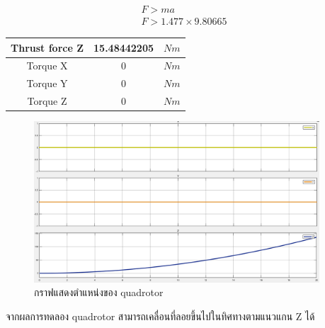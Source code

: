 \begin{equation}
    \begin{array}{c}
    {F > ma}\\
    {F > 1.477 \times 9.80665}
    \label{equ:newton_law}
    \end{array}
\end{equation}
\begin{center}
    \begin{tabular}{ | c | c | c | } 
    \hline
    Thrust force Z & 15.48442205 & $Nm$ \\ 
    \hline
    Torque X & 0 & $Nm$ \\ 
    \hline
    Torque Y & 0 & $Nm$ \\ 
    \hline
    Torque Z & 0 & $Nm$ \\ 
    \hline
    \end{tabular}
\end{center}
\begin{figure}[!ht]
	\centering
	\includegraphics[width=0.95\textwidth]{images/simulink/test_climbup.png}
	\caption{กราฟแสดงตำแหน่งของ quadrotor}
\end{figure}

จากผลการทดลอง quadrotor สามารถเคลื่อนที่ลอยขึ้นไปในทิศทางตามแนวแกน Z ได้

\